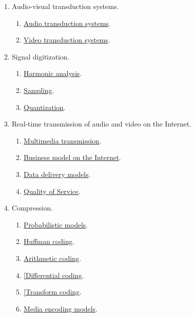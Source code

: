 \begin{enumerate}
\begin{enumerate}
\item Audio-visual transduction systems.
  \begin{enumerate}
  \item \href{https://cdn.rawgit.com/vicente-gonzalez-ruiz/audio_transduction_systems/master/index.html}{Audio transduction systems}.
  \item \href{https://cdn.rawgit.com/vicente-gonzalez-ruiz/video_transduction_systems/master/index.html}{Video transduction systems}.
  \end{enumerate}
\item Signal digitization.
  \begin{enumerate}               
  \item \href{https://cdn.rawgit.com/vicente-gonzalez-ruiz/harmonic_analysis/master/index.html}{Harmonic analysis}.
  \item \href{https://cdn.rawgit.com/vicente-gonzalez-ruiz/sampling/master/index.html}{Sampling}.
  \item \href{https://cdn.rawgit.com/vicente-gonzalez-ruiz/quantization/master/index.html}{Quantization}.
  \end{enumerate}
  
\item Real-time transmission of audio and video on the Internet.
  \begin{enumerate}
  \item \href{(https://cdn.rawgit.com/vicente-gonzalez-ruiz/multimedia_transmission/master/index.html}{Multimedia transmission}.
  \item \href{https://cdn.rawgit.com/vicente-gonzalez-ruiz/Intenet_business_model/master/index.html}{Business model on the Internet}.
  \item \href{https://cdn.rawgit.com/vicente-gonzalez-ruiz/data_delivery_models/master/index.html}{Data delivery models}.
  \item \href{https://cdn.rawgit.com/vicente-gonzalez-ruiz/quality_of_service/master/index.html}{Quality of Service}.
  \end{enumerate}
  
\item Compression.
  \begin{enumerate}
  \item \href{https://cdn.rawgit.com/vicente-gonzalez-ruiz/Probabilistic_Models/master/index.html}{Probabilistic models}.
  \item \href{https://rawgit.com/vicente-gonzalez-ruiz/Huffman_Coding/master/index.html}{Huffman coding}.
  \item \href{https://cdn.rawgit.com/vicente-gonzalez-ruiz/Arithmetic_Coding/master/index.html}{Arithmetic coding}.
  \item \href{https://cdn.rawgit.com/vicente-gonzalez-ruiz/differential_coding/master/index.html}{[Differential coding}.
  \item \href{https://cdn.rawgit.com/vicente-gonzalez-ruiz/transform_coding/master/index.html}{[Transform coding}.
  \item \href{https://cdn.rawgit.com/vicente-gonzalez-ruiz/media_encoding_models/master/index.html}{Media encoding models}.
  \end{enumerate}


\end{enumerate}
\end{enumerate}
